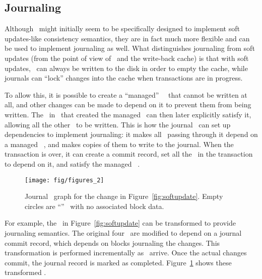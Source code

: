 \subsection{Journaling}
\label{sec:consistency:journal}


Although \chdescs\ might initially seem to be specifically designed to
implement soft updates-like consistency semantics, they are in fact much more
flexible and can be used to implement journaling as well. What distinguishes
journaling from soft updates (from the point of view of \chdescs\ and
the write-back cache) is that with soft updates, \chdescs\ can always
be written to the disk in order to empty the cache, while journals can
``lock'' changes into the cache when transactions are in progress.

To allow this, it is possible to create a ``managed'' \noop\ \chdesc\ that
cannot be written at all, and other changes can be made to depend on it to
prevent them from being written. The \module\ in \Kudos\ that created the
managed \chdesc\ can then later explicitly satisfy it, allowing all the other
\chdescs\ to be written. This is how the journal \module\ can set up
dependencies to implement journaling: it makes all \chdescs\ passing through it
depend on a managed \noop\ \chdesc, and makes copies of them to write to the
journal. When the transaction is over, it can create a commit record, set all
the \chdescs\ in the transaction to depend on it, and satisfy the managed \noop\
\chdesc.

\begin{figure}
  \centering
  \texttt{[image: fig/figures\_2]}
  \caption{\label{fig:journal} Journal \chdesc\ graph for the
    change in Figure~\ref{fig:softupdate}. Empty circles are
    ``\noop'' \chdescs\ with no associated block data.}
\end{figure}

For example, the \chdescs\ in Figure~\ref{fig:softupdate} can be transformed to
provide journaling semantics. The original four \chdescs\ are modified to depend
on a journal commit record, which depends on blocks journaling the changes. This
transformation is performed incrementally as \chdescs\ arrive. Once the actual
changes commit, the journal record is marked as completed.
Figure~\ref{fig:journal} shows these transformed \chdescs.

